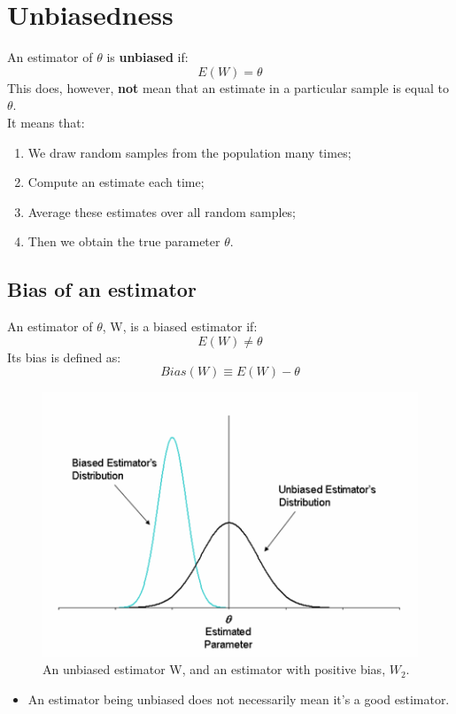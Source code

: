 \documentclass[11pt,a4paper]{report}
\begin{document}
\section{Unbiasedness}
An estimator of $\theta$ is \textbf{unbiased} if: \[E(W) = \theta\]
This does, however, \textbf{not} mean that an estimate in a particular sample is equal to $\theta$.
\\It means that:
\begin{enumerate}
    \item We draw random samples from the population many times;
    \item Compute an estimate each time;
    \item Average these estimates over all random samples;
    \item Then we obtain the true parameter $\theta$.
\end{enumerate}

\subsection{Bias of an estimator}
An estimator of $\theta$, W, is a biased estimator if:
\[E(W) \neq \theta\]
Its bias is defined as:
\[Bias(W) \equiv E(W) - \theta\]

\begin{figure}[h]
    \centering
    \includegraphics[width=\textwidth]{images/unbiasedness.png}
    \caption{An unbiased estimator W, and an estimator with positive bias, $W_2$.}
    \label{Unbiasedness}
\end{figure}

\begin{itemize}
    \item An estimator being unbiased does not necessarily mean it's a good estimator.
\end{itemize}
\end{document}

